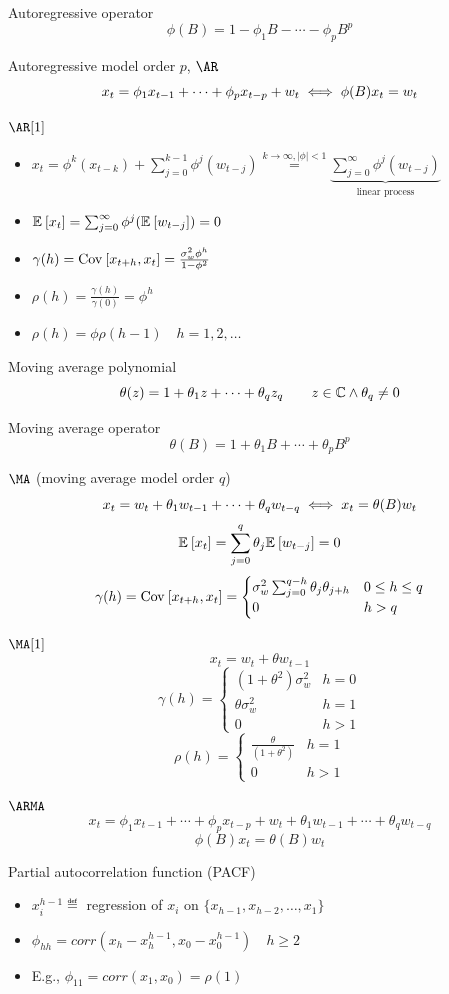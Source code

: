 \documentclass[landscape]{article}
\begin{document}
\begin{multicols*}{2}
Autoregressive operator
\[\phi(B) = 1 - \phi_1B - \cdots - \phi_pB^p\]

Autoregressive model order $p$, $\AR$
\[x_t = \phi_1 x_{t-1} + \cdots + \phi_p x_{t-p} + w_t \;\Longleftrightarrow\; \phi(B)x_t = w_t\]

$\AR[1]$
\begin{itemize}
  \item $x_t = \phi^k(x_{t-k}) + \displaystyle\sum_{j=0}^{k-1} \phi^j(w_{t-j})
    \stackrel{k\to\infty, |\phi| < 1}{=}
    \underbrace{\sum_{j=0}^\infty \phi^j(w_{t-j})}_{\text{linear process}}$
\item $\mathbb{E}_{}\left[x_t\right] = \sum_{j=0}^\infty\phi^j(\mathbb{E}_{}\left[w_{t-j}\right]) = 0$
\item $\gamma(h) = \mathrm{Cov}_{}\left[x_{t+h},x_t\right] = \frac{\sigma_w^2\phi^h}{1-\phi^2}$
\item $\rho(h) = \frac{\gamma(h)}{\gamma(0)} = \phi^h$
\item $\rho(h) = \phi \rho(h-1) \quad h=1,2,\ldots$
\end{itemize}

Moving average polynomial
\[\theta(z) = 1 + \theta_1 z + \cdots + \theta_q z_q
\qquad z \in \mathbb{C} \wedge \theta_q \neq 0\]

Moving average operator
\[\theta(B) = 1 + \theta_1B + \cdots + \theta_pB^p\]

$\MA$ (moving average model order $q$)
\[x_t = w_t + \theta_1 w_{t-1} + \cdots + \theta_q w_{t-q}
\;\Longleftrightarrow\; x_t = \theta(B)w_t\]
\[\mathbb{E}_{}\left[x_t\right] = \sum_{j=0}^q \theta_j\mathbb{E}_{}\left[w_{t-j}\right] = 0\]
\[\gamma(h) = \mathrm{Cov}_{}\left[x_{t+h},x_t\right] = \begin{cases}
  \sigma_w^2\sum_{j=0}^{q-h} \theta_j\theta_{j+h} & 0 \le h \le q \\
  0 & h > q
\end{cases}\]

$\MA[1]$
\[x_t = w_t + \theta w_{t-1}\]
\[\gamma(h) = \begin{cases}
  (1+\theta^2)\sigma_w^2 & h = 0 \\
  \theta\sigma_w^2 & h = 1 \\
  0 & h > 1
\end{cases}\]
\[\rho(h) = \begin{cases}
  \frac{\theta}{(1+\theta^2)} & h = 1 \\
  0 & h > 1
\end{cases}\]

$\ARMA$
\[x_t = \phi_1 x_{t-1} + \cdots + \phi_p x_{t-p} + w_t + \theta_1 w_{t-1} +
\cdots + \theta_q w_{t-q}\]
\[\phi(B) x_t = \theta(B) w_t\]

Partial autocorrelation function (PACF)
\begin{itemize}
  \item $x_i^{h-1} \eqdef$ regression of $x_i$ on
    $\{x_{h-1}, x_{h-2}, \dots, x_1\}$
  \item $\phi_{hh} = corr(x_h - x_h^{h-1}, x_0 - x_0^{h-1}) \quad h \ge 2$
  \item E.g., $\phi_{11} = corr(x_1,x_0) = \rho(1)$
\end{itemize}


\end{multicols*}
\end{document}
